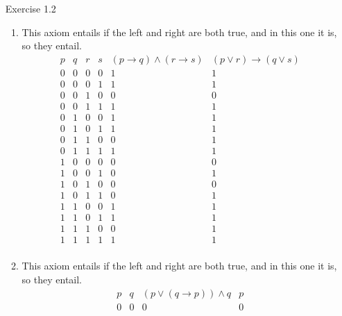 \documentclass[letterpaper, 12pt]{article}
\begin{document}
\begin{enumerate}
    \item[Exercise 1.2]  
        \begin{enumerate}
            \item This axiom entails if the left and right are both true, and in this one it is, so they entail.
            \begin{displaymath}
                \begin{array}{|c|c|c|c|c|c}
                    p & q & r & s &  (p \rightarrow q) \land (r \rightarrow s) & (p \lor r) \rightarrow (q \lor s)\\
                    \hline
                    0 & 0 & 0 & 0 & 1 & 1\\
                    0 & 0 & 0 & 1 & 1 & 1\\
                    0 & 0 & 1 & 0 & 0 & 0\\
                    0 & 0 & 1 & 1 & 1 & 1\\
                    0 & 1 & 0 & 0 & 1 & 1\\
                    0 & 1 & 0 & 1 & 1 & 1\\
                    0 & 1 & 1 & 0 & 0 & 1\\
                    0 & 1 & 1 & 1 & 1 & 1\\
                    1 & 0 & 0 & 0 & 0 & 0\\
                    1 & 0 & 0 & 1 & 0 & 1\\
                    1 & 0 & 1 & 0 & 0 & 0\\
                    1 & 0 & 1 & 1 & 0 & 1\\
                    1 & 1 & 0 & 0 & 1 & 1\\
                    1 & 1 & 0 & 1 & 1 & 1\\
                    1 & 1 & 1 & 0 & 0 & 1\\
                    1 & 1 & 1 & 1 & 1 & 1\\
                \end{array}
            \end{displaymath}
            \item This axiom entails if the left and right are both true, and in this one it is, so they entail.
            \begin{displaymath}
                \begin{array}{|c|c|c|c|}
                    p & q & (p \lor (q \rightarrow p)) \land q & p \\
                    \hline
                    0 & 0 & 0 & 0\\

\end{array}
\end{displaymath}
\end{enumerate}
\end{enumerate}
\end{document}
